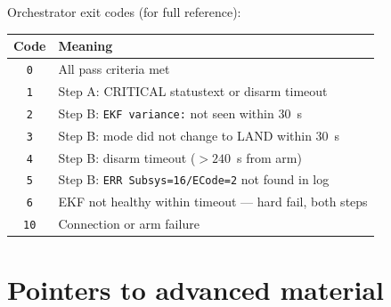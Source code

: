 \documentclass[a4paper,11pt,twoside]{article}
\begin{document}
Orchestrator exit codes (for full reference):

\begin{center}\small
\begin{tabular}{|c|p{12.0cm}|}\hline
\textbf{Code} & \textbf{Meaning} \\ \hline
\texttt{0} & All pass criteria met \\ \hline
\texttt{1} & Step A: CRITICAL statustext or disarm timeout \\ \hline
\texttt{2} & Step B: \texttt{EKF variance:} not seen within 30~s \\ \hline
\texttt{3} & Step B: mode did not change to LAND within 30~s \\ \hline
\texttt{4} & Step B: disarm timeout ($>240$~s from arm) \\ \hline
\texttt{5} & Step B: \texttt{ERR Subsys=16/ECode=2} not found in log \\ \hline
\texttt{6} & EKF not healthy within timeout --- hard fail, both steps \\ \hline
\texttt{10} & Connection or arm failure \\ \hline
\end{tabular}
\end{center}

\section*{Pointers to advanced material}
\end{document}
